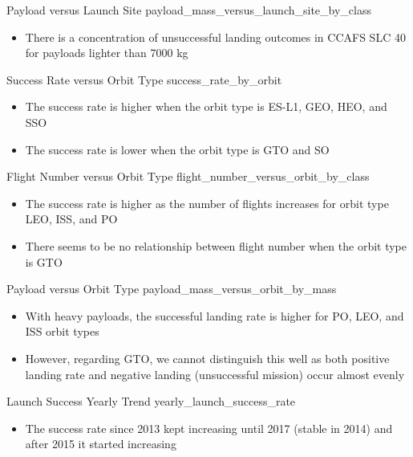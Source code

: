 \begin{frame}{Payload versus Launch Site}
    {payload_mass_versus_launch_site_by_class}
    \begin{itemize}
        \item There is a concentration of unsuccessful landing outcomes in CCAFS SLC 40 for payloads lighter than 7000 kg
    \end{itemize}
\end{frame}

\begin{frame}{Success Rate versus Orbit Type}
    {success_rate_by_orbit}
    \begin{itemize}
        \item The success rate is higher when the orbit type is ES-L1, GEO, HEO, and SSO
        \item The success rate is lower when the orbit type is GTO and SO
    \end{itemize}
\end{frame}

\begin{frame}{Flight Number versus Orbit Type}
    {flight_number_versus_orbit_by_class}
    \begin{itemize}
        \item The success rate is higher as the number of flights increases for orbit type LEO, ISS, and PO
        \item There seems to be no relationship between flight number when the orbit type is GTO
    \end{itemize}
\end{frame}

\begin{frame}{Payload versus Orbit Type}
    {payload_mass_versus_orbit_by_mass}
    \begin{itemize}
        \item With heavy payloads, the successful landing rate is higher for PO, LEO, and ISS orbit types
        \item However, regarding GTO, we cannot distinguish this well as both positive landing rate and negative landing (unsuccessful mission) occur almost evenly
    \end{itemize}
\end{frame}

\begin{frame}{Launch Success Yearly Trend}
    {yearly_launch_success_rate}
    \begin{itemize}
        \item The success rate since 2013 kept increasing until 2017 (stable in 2014) and after 2015 it started increasing
    \end{itemize}
\end{frame}

